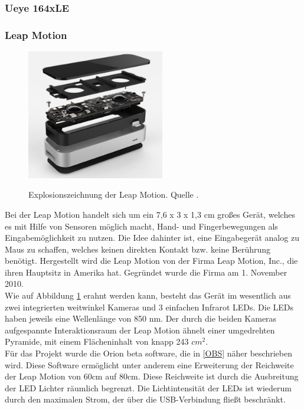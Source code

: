 \subsubsection{Ueye 164xLE} 


\subsubsection{Leap Motion} 

\begin{figure}[H]
		\center 
		\includegraphics[width=6cm]{Bilder/leap-motion.png}
			\label{fig:leapMotion}
			\caption{Explosionszeichnung der Leap Motion. Quelle \cite{website:LeapMotionBlog}.}
	\end{figure}
	
Bei der Leap Motion \cite{website:LeapMotion} handelt sich um ein 7,6 x 3 x 1,3 cm großes Gerät, welches es mit Hilfe von Sensoren möglich macht, Hand- und Fingerbewegungen als Eingabemöglichkeit zu nutzen. Die Idee dahinter ist, eine Eingabegerät analog zu Maus zu schaffen, welches keinen direkten Kontakt bzw. keine Berührung benötigt. Hergestellt wird die Leap Motion von der Firma Leap Motion, Inc., die ihren Hauptsitz in Amerika hat. Gegründet wurde die Firma am 1. November 2010. \\
Wie auf Abbildung \ref{fig:leapMotion} erahnt werden kann, besteht das Gerät im wesentlich aus zwei integrierten weitwinkel Kameras und 3 einfachen Infrarot LEDs. Die LEDs haben jeweils eine Wellenlänge von 850 nm. Der durch die beiden Kameras aufgespannte Interaktionsraum der Leap Motion ähnelt einer umgedrehten Pyramide, mit einem Flächeninhalt von knapp 243 $cm{^2}$. \\
Für das Projekt wurde die Orion beta software, die in \ref{OBS} näher beschrieben wird. Diese Software ermöglicht unter anderem eine Erweiterung der Reichweite der Leap Motion von 60cm auf 80cm. Diese Reichweite ist durch die Ausbreitung der LED Lichter räumlich begrenzt. Die Lichtintensität der LEDs ist wiederum durch den maximalen Strom, der über die USB-Verbindung fließt beschränkt. \\


